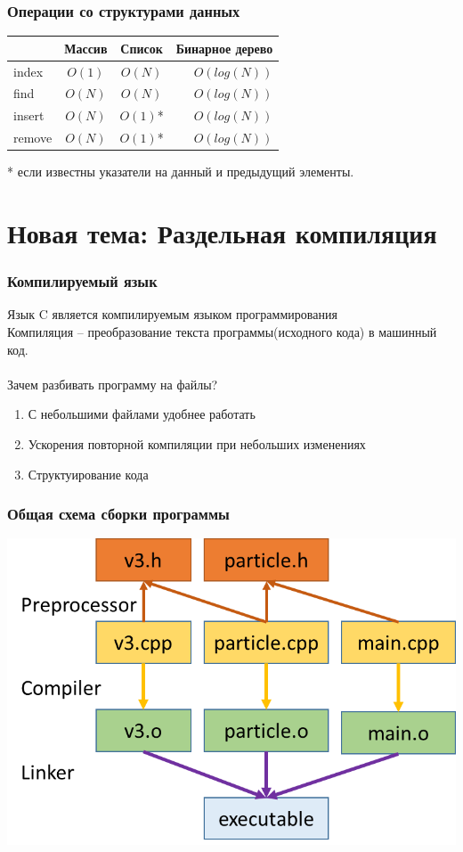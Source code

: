 \documentclass[10pt]{beamer}
\begin{document}
\begin{frame}[fragile]
\frametitle{Операции со структурами данных}
\begin{center}
  \begin{tabular}{  l | c c r }
      & Массив & Список & Бинарное дерево \\
    \hline
    index & $O(1)$ & $O(N)$ & $O(log(N))$ \\
    find & $O(N)$ & $O(N)$ & $O(log(N))$ \\
    insert & $O(N)$ & $O(1)$* & $O(log(N))$ \\
    remove & $O(N)$ & $O(1)$* & $O(log(N))$ \\
    \hline
  \end{tabular}
\end{center}
* если известны указатели на данный и предыдущий элементы.
\end{frame}

\section{Новая тема: Раздельная компиляция}

\begin{frame}[fragile]
\frametitle{Компилируемый язык} 
Язык C является компилируемым языком программирования \\
Компиляция -- преобразование текста программы(исходного кода) в машинный код. \\
\quad\\
Зачем разбивать программу на файлы?
\begin{enumerate}
\item С небольшими файлами удобнее работать
\item Ускорения повторной компиляции при небольших изменениях
\item Структуирование кода
\end{enumerate}

\end{frame}

\begin{frame}[fragile]
\frametitle{Общая схема сборки программы} 
\begin{center}
\includegraphics[width=0.95\linewidth]{images/separate_compilation_linking.png}
\end{center}
\end{frame}
\end{document}
